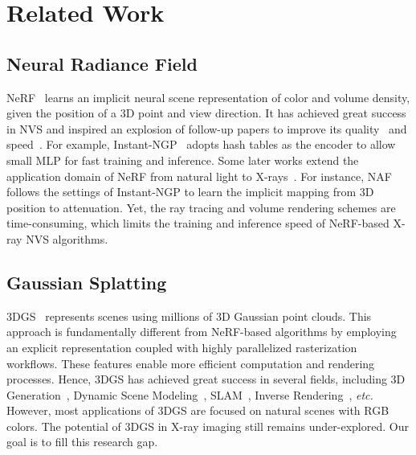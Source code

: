 \documentclass[runningheads]{llncs}
\begin{document}
\vspace{-4mm}
\section{Related Work}
\vspace{-1.5mm}

\subsection{Neural Radiance Field}
\vspace{-0.5mm}

NeRF~\cite{nerf} learns an implicit neural scene representation of color and volume density, given the position of a 3D point and view direction. It has achieved great success in NVS and inspired an explosion of follow-up papers to improve its quality~\cite{mip_nerf,mipnerf360,refnerf,trimiprf,zipnerf} and speed~\cite{instant_ngp,merf,tensorf,nerfacc,bakedsdf,mobilenerf,EfficientNeRF}.  For example, Instant-NGP~\cite{instant_ngp} adopts hash tables as the encoder to allow small MLP for fast training and inference. Some later works extend the application domain of NeRF from natural light to X-rays~\cite{intratomo,naf,mednerf,cai2023structure}. For instance, 
NAF~\cite{naf} follows the settings of Instant-NGP to learn the implicit mapping from 3D position to attenuation. Yet, the ray tracing and volume rendering schemes are time-consuming, which limits the training and inference speed of NeRF-based X-ray NVS algorithms.


\vspace{-3mm}
\subsection{Gaussian Splatting}
\vspace{0mm}
3DGS~\cite{3dgs} represents scenes using millions of 3D Gaussian point clouds. This approach is fundamentally different from NeRF-based algorithms by employing an explicit representation coupled with highly parallelized rasterization workflows. These features enable more efficient computation and rendering processes. Hence, 3DGS has achieved great success in several fields, including 3D  Generation~\cite{dreamgaussian,gaussiandreamer,luciddreamer,hugs,gauhuman}, Dynamic Scene Modeling~\cite{dynamic1,dynamic2,dynamic3}, SLAM~\cite{slam1,slam2,slam3,slam4}, Inverse Rendering~\cite{InverseRendering1,InverseRendering2,InverseRendering3}, \emph{etc.} However, most applications of 3DGS are focused on natural scenes with RGB colors. The potential of 3DGS in X-ray imaging still remains under-explored. Our goal is to fill this research gap.
\end{document}
